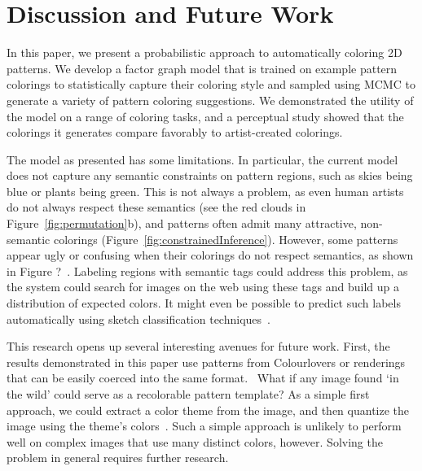 \section{Discussion and Future Work}
\label{sec:discussion}

In this paper, we present a probabilistic approach to automatically coloring 2D patterns. We develop a factor graph model that is trained on example pattern colorings to statistically capture their coloring style and sampled using MCMC to generate a variety of pattern coloring suggestions. We demonstrated the utility of the model on a range of coloring tasks, and a perceptual study showed that the colorings it generates compare favorably to artist-created colorings.

The model as presented has some limitations. In particular, the current model does not capture any semantic constraints on pattern regions, such as skies being blue or plants being green. This is not always a problem, as even human artists do not always respect these semantics (see the red clouds in Figure~\ref{fig:permutation}b), and patterns often admit many attractive, non-semantic colorings (Figure~\ref{fig:constrainedInference}). However, some patterns appear ugly or confusing when their colorings do not respect semantics, as shown in Figure ?~. Labeling regions with semantic tags could address this problem, as the system could search for images on the web using these tags and build up a distribution of expected colors. It might even be possible to predict such labels automatically using sketch classification techniques~\cite{SketchClassification}.~ 

This research opens up several interesting avenues for future work.
First, the results demonstrated in this paper use patterns from Colourlovers or renderings that can be easily coerced into the same format.~ What if any image found `in the wild' could serve as a recolorable pattern template? As a simple first approach, we could extract a color theme from the image, and then quantize the image using the theme's colors~\cite{SharonPaletteExtraction}. Such a simple approach is unlikely to perform well on complex images that use many distinct colors, however. Solving the problem in general requires further research.

